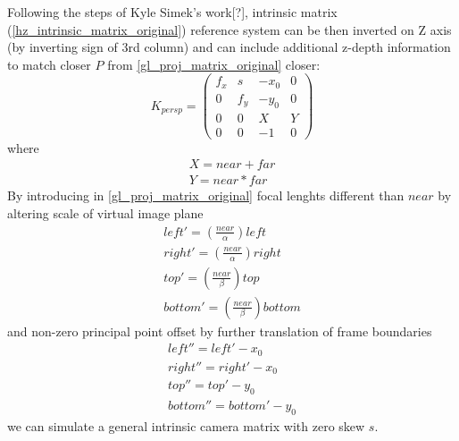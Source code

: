 Following the steps of Kyle Simek's work[?], intrinsic matrix (\ref{hz_intrinsic_matrix_original}) reference system can be then inverted on Z axis (by inverting sign of 3rd column) and can include additional z-depth information to match closer $P$ from \ref{gl_proj_matrix_original} closer:
\begin{equation}
K_{persp} = \left( \begin{array}{cccc} f_x & s & -x_0 & 0 \\ 0 & f_y & -y_0 & 0 \\ 0 & 0 & X & Y \\ 0 & 0 & -1 & 0 \end{array} \right)
\label{hz_intrinsic_matrix_extended}
\end{equation}
where
\begin{equation}
\begin{array}{c}
X = near + far \\
Y = near * far
\end{array}
\label{hz_intrinsic_matrix_extended_details}
\end{equation}
By introducing in \ref{gl_proj_matrix_original} focal lenghts different than $near$ by altering scale of virtual image plane
\begin{equation}
\begin{array}{c}
left' = (\frac{near}{\alpha}) left \\
right' = (\frac{near}{\alpha}) right \\
top' = (\frac{near}{\beta}) top \\
bottom' = (\frac{near}{\beta}) bottom
\end{array}
\label{near_alter_scale}
\end{equation}
and non-zero principal point offset by further translation of frame boundaries
\begin{equation}
\begin{array}{c}
left'' = left' - x_0 \\
right'' = right' - x_0 \\
top'' = top' - y_0 \\
bottom'' = bottom' - y_0
\end{array}
\label{near_alter_offset}
\end{equation}
we can simulate a general intrinsic camera matrix with zero skew $s$.

